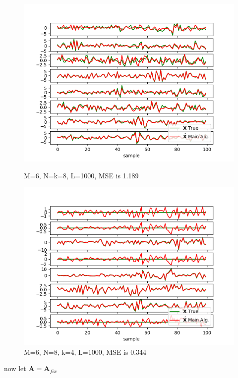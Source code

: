 \begin{figure}[H]
    \begin{minipage}[t]{.45\textwidth}
		\centering
		\includegraphics[scale=0.5]{figures/ch_estimate/k_test2.png}
	\caption{M=6, N=k=8, L=1000, MSE is 1.189}
	\label{fig:ktest2}
    \end{minipage} 
    \hfill
    \begin{minipage}[t]{.45\textwidth}
		\centering
		\includegraphics[scale=0.5]{figures/ch_estimate/k_test3.png}
	\caption{M=6, N=8, k=4, L=1000, MSE is 0.344}
	\label{fig:ktest3}
    \end{minipage}
\end{figure}

now let $\textbf{A} = \textbf{A}_{fix}$ 


